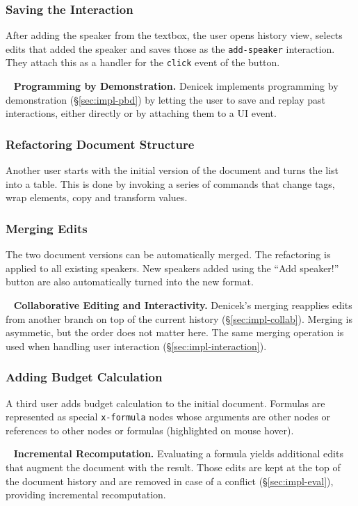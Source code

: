 \documentclass[sigconf]{acmart}
\newcommand*\circled[1]{\textnormal{\footnotesize\sffamily\bfseries\protect\tikz[baseline=(char.base)]{
  \node[shape=circle,fill=black,text=white,draw,inner sep=1pt] (char) {#1};}}}
\DeclareRobustCommand{\keyideabox}[3]{\begin{tcolorbox}[breakable,
  boxsep=5pt,left=0pt,right=0pt,top=0pt,bottom=0pt,width=\dimexpr\columnwidth\relax,
  colback=gray!20,colframe=gray!20,
  enlarge bottom by=0pt,enlarge top by=0pt,
  arc=0pt,outer arc=0pt]
\lettrine[lraise=0.3]{\LARGE #1}{~}
\small \textbf{#2.} #3
\end{tcolorbox}
}
\begin{document}
\subsubsection*{\circled{C} Saving the Interaction} After adding the speaker from the textbox,
the user opens history view, selects edits that added the speaker and saves those as the
\Verb_add-speaker_ interaction. They attach this as a handler for the \Verb_click_ event of the button.

\keyideabox{\faLightbulbO}{Programming by Demonstration}{Denicek implements programming by
demonstration (\S\ref{sec:impl-pbd}) by letting the user to save and replay past interactions,
either directly or by attaching them to a UI event.}

\subsubsection*{\circled{D} Refactoring Document Structure} Another user starts with the initial
version of the document and turns the list into a table. This is done by invoking a series of
commands that change tags, wrap elements, copy and transform values.

\subsubsection*{\circled{E} Merging Edits} The two document versions can be automatically merged.
The refactoring is applied to all existing speakers. New speakers added using the ``Add speaker!''
button are also automatically turned into the new format.

\keyideabox{\faLightbulbO}{Collaborative Editing and Interactivity}{Denicek's merging
reapplies edits from another branch on top of the current history (\S\ref{sec:impl-collab}).
Merging is asymmetic, but the order does not matter here. The same merging operation is used
when handling user interaction (\S\ref{sec:impl-interaction}).}

\subsubsection*{\circled{F} Adding Budget Calculation} A third user adds budget calculation to
the initial document. Formulas are represented as special \Verb_x-formula_ nodes whose arguments
are other nodes or references to other nodes or formulas (highlighted on mouse hover).

\keyideabox{\faLightbulbO}{Incremental Recomputation}{Evaluating a formula yields additional
edits that augment the document with the result. Those edits are kept
at the top of the document history and are removed in case of a conflict (\S\ref{sec:impl-eval}),
providing incremental recomputation.}
\end{document}

